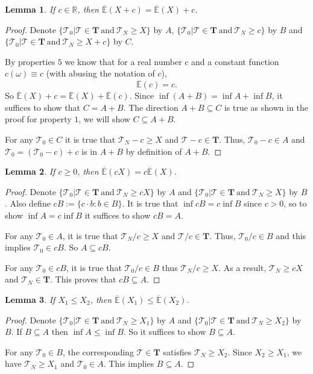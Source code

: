 \documentclass{article}
\def\uE{\overline{\mathbb{E}}}
\def\t{\mathcal{T}}
\def\T{\mathbf{T}}
\newtheorem{lemma}{Lemma}
\begin{document}
\begin{lemma}
 If $c \in \mathbb{R}$, then $\uE(X+c) = \uE(X) + c$.
\end{lemma} 
\begin{proof}
Denote $\{\t_0 | \t \in \T \ \text{and}\  \t_N \geq X \}$ by $A$, $\{\t_0 | \t \in \T \ \text{and}\  \t_N \geq c \}$ by $B$ and $\{\t_0 | \t \in \T \ \text{and}\  \t_N \geq X +c\}$ by $C$.

By properties $5$ we know that for a real number $c$ and a constant function $c(\omega) \equiv c$ (with abusing the notation of $c$),
\begin{equation}
  \uE(c) = c.
\end{equation}
So $\uE(X) + c = \uE(X) + \uE(c)$. Since $\inf(A+B) = \inf A + \inf B$, it suffices to show that $C=A+B$. The direction $A+B \subseteq C$ is true as shown in the proof for property $1$, we will show  $C \subseteq A+B$.

For any $\t_0 \in C$ it is true that $\t_N - c \geq X$ and $\t-c \in \T$. Thus, $\t_0 -c \in A$ and $\t_0 = (\t_0 -c) + c $ is in $A+B$ by definition of $A+B$.   
\end{proof}

\begin{lemma}
 If $c \geq 0$, then $\uE(cX) = c\uE(X)$.
\end{lemma} 
\begin{proof}
Denote $\{\t_0 | \t \in \T \ \text{and}\  \t_N \geq cX \}$ by $A$ and $\{\t_0 | \t \in \T \ \text{and}\  \t_N \geq X \}$ by $B$. Also define $cB := \{c \cdot b: b \in B\}$. It is true that $\inf cB = c \inf B$ since $c > 0$, so to show $\inf A = c\inf B$ it suffices to show $cB = A$.

For any $\t_0 \in A$, it is true that $\t_N/c \geq X$ and $\t/c \in \T$. Thus, $\t_0 /c \in B$ and this implies $\t_0 \in cB$. So $A \subseteq cB$.

For any $\t_0 \in cB$, it is true that $\t_0/c \in B$ thus $\t_N/c \geq X$. As a result, $\t_N \geq cX$ and $\t_N \in \T$. This proves that $cB \subseteq A$.
\end{proof}

\begin{lemma}
 If $X_1 \leq X_2$, then $\uE(X_1) \leq \uE(X_2)$.
\end{lemma}
\begin{proof}
Denote $\{\t_0 | \t \in \T \ \text{and}\  \t_N \geq X_1 \}$ by $A$ and $\{\t_0 | \t \in \T \ \text{and}\  \t_N \geq X_2 \}$ by $B$. If $B \subseteq A$ then $\inf A \leq \inf B$. So it suffices to show $B \subseteq A$.

For any $\t_0 \in B$, the corresponding $\t \in \T$ satisfies $\t_N \geq X_2$. Since $X_2 \geq X_1$, we have $\t_N \geq X_1$ and $\t_0 \in A$. This implies $B \subseteq A$.
\end{proof}
\end{document}
